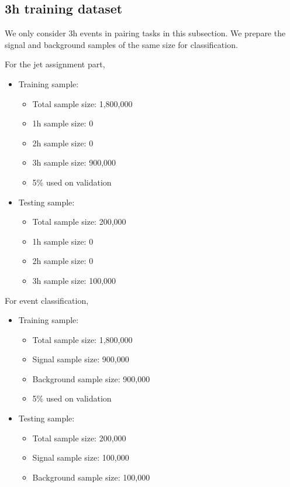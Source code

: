 \documentclass[12pt]{article}
\begin{document}
	\subsection{3h training dataset}%
	\label{sub:3h_training_dataset}
		We only consider 3h events in pairing tasks in this subsection. We prepare the signal and background samples of the same size for classification.

		For the jet assignment part,
		\begin{itemize}
			\item Training sample:
			\begin{itemize}
				\item Total sample size: 1,800,000
				\item 1h sample size: 0
				\item 2h sample size: 0
				\item 3h sample size: 900,000
				\item 5\% used on validation
			\end{itemize}
			\item Testing sample:
			\begin{itemize}
				\item Total sample size: 200,000
				\item 1h sample size: 0
				\item 2h sample size: 0
				\item 3h sample size: 100,000
			\end{itemize}
		\end{itemize}

		For event classification,
		\begin{itemize}
			\item Training sample:
			\begin{itemize}
				\item Total sample size: 1,800,000
				\item Signal sample size: 900,000
				\item Background sample size: 900,000
				\item 5\% used on validation
			\end{itemize}
			\item Testing sample:
			\begin{itemize}
				\item Total sample size: 200,000
				\item Signal sample size: 100,000
				\item Background sample size: 100,000
			\end{itemize}
		\end{itemize}
\end{document}
